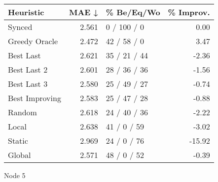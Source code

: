 \begin{tabular}{lrlr}
\toprule
\textbf{Heuristic} & \textbf{MAE ↓} & \textbf{\% Be/Eq/Wo} & \textbf{\% Improv.} \\
\midrule
            Synced &          2.561 &          0 / 100 / 0 &                0.00 \\
     Greedy Oracle &          2.472 &          42 / 58 / 0 &                3.47 \\
         Best Last &          2.621 &         35 / 21 / 44 &               -2.36 \\
       Best Last 2 &          2.601 &         28 / 36 / 36 &               -1.56 \\
       Best Last 3 &          2.580 &         25 / 49 / 27 &               -0.74 \\
    Best Improving &          2.583 &         25 / 47 / 28 &               -0.88 \\
            Random &          2.618 &         24 / 40 / 36 &               -2.22 \\
             Local &          2.638 &          41 / 0 / 59 &               -3.02 \\
            Static &          2.969 &          24 / 0 / 76 &              -15.92 \\
            Global &          2.571 &          48 / 0 / 52 &               -0.39 \\
\bottomrule
\end{tabular}
\caption{Node 5}
\label{tab:hr_iid_lr05_le1_bs2_5}
